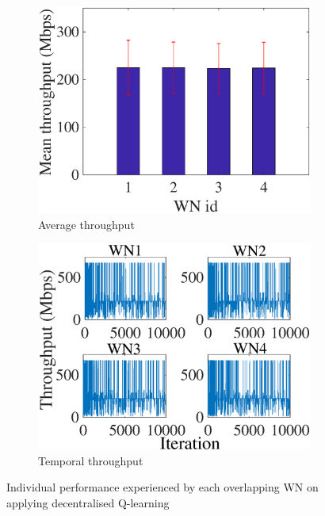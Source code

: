 \documentclass[12pt, a4paper,twoside]{tesi_upf}
\begin{document}
			\begin{figure}[t!]
				\centering
				\begin{subfigure}[b]{0.4\textwidth}
					\includegraphics[width=\textwidth]{images/e_1_a1_g095_avg_tpt}
					\caption{Average throughput}
					\label{fig:ql_avg_tpt}
				\end{subfigure}
				\begin{subfigure}[b]{0.4\textwidth}
					\includegraphics[width=\textwidth]{images/e_1_a1_g095_ind_tpt}
					\caption{Temporal throughput}
					\label{fig:ql_temporal_tpt}
				\end{subfigure}		
				\caption{Individual performance experienced by each overlapping WN on applying decentralised Q-learning \cite{wilhelmi2017implications}}
				\label{fig:ql_performance}
			\end{figure}
		
\end{document}
